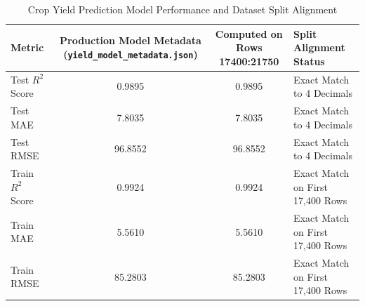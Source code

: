 \begin{table}[htbp]
\centering
\caption{Crop Yield Prediction Model Performance and Dataset Split Alignment}
\label{tab:yield_model_metrics}
\begin{tabular}{|l|c|c|l|}
\hline
\textbf{Metric} & \textbf{Production Model Metadata (\texttt{yield\_model\_metadata.json})} & \textbf{Computed on Rows 17400:21750} & \textbf{Split Alignment Status} \\ \hline
Test $R^2$ Score  & 0.9895  & 0.9895  & Exact Match to 4 Decimals \\
Test MAE          & 7.8035  & 7.8035  & Exact Match to 4 Decimals \\
Test RMSE         & 96.8552 & 96.8552 & Exact Match to 4 Decimals \\
Train $R^2$ Score & 0.9924  & 0.9924  & Exact Match on First 17,400 Rows \\
Train MAE         & 5.5610  & 5.5610  & Exact Match on First 17,400 Rows \\
Train RMSE        & 85.2803 & 85.2803 & Exact Match on First 17,400 Rows \\ \hline
\end{tabular}
\end{table}
